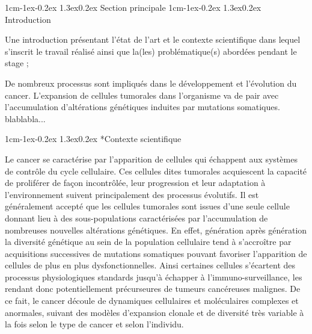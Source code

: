 \documentclass[12pt]{report}
\makeatletter
\renewcommand\section{\@startsection{section}{1}{\z@}%
	{1cm\@plus -1ex\@minus -0.2ex}%
	{1.3ex\@plus 0.2ex}%
	{\reset@font\Large\bf\sc}}
\renewcommand\subsection{\@startsection{subsection}{2}{\z@}%
	{1cm\@plus -1ex\@minus -0.2ex}%
	{1.3ex\@plus 0.2ex}%
	{\reset@font\large\bf}}
\renewcommand\subsubsection{\@startsection{subsubsection}{3}{\z@}%
	{1cm\@plus -1ex\@minus -0.2ex}%
	{1.3ex\@plus 0.2ex}%
	{\reset@font\normalsize\bf}}
\makeatother
\begin{document}
\section{Section principale}
\subsection{Introduction}

Une introduction présentant l'état de l'art et le contexte scientifique dans lequel s'inscrit le travail réalisé ainsi que la(les) problématique(s) abordées pendant le stage ;

De nombreux processus sont impliqués dans le développement et l’évolution du cancer. L’expansion de cellules tumorales dans l’organisme va de pair avec l’accumulation d’altérations génétiques induites par mutations somatiques.
blablabla...

\subsubsection*{Contexte scientifique}

Le cancer se caractérise par l'apparition de cellules qui échappent aux systèmes de contrôle du cycle cellulaire.
Ces cellules dites tumorales acquiescent la capacité de proliférer de façon incontrôlée, leur progression et leur adaptation à l'environnement suivent principalement des processus évolutifs. 
Il est généralement accepté que les cellules tumorales sont issues d’une seule cellule donnant lieu à des sous-populations caractérisées par l'accumulation de nombreuses nouvelles altérations génétiques. 
En effet, génération après génération la diversité génétique au sein de la population cellulaire tend à s'accroître par acquisitions successives de mutations somatiques\cite{MCGRANAHAN201515} pouvant favoriser l'apparition de cellules de plus en plus dysfonctionnelles. 
Ainsi certaines cellules s'écartent des processus physiologiques standards jusqu'à échapper à l'immuno-surveillance, les rendant donc potentiellement précurseures de tumeurs cancéreuses malignes. 
De ce fait, le cancer découle de dynamiques cellulaires et moléculaires complexes et anormales, suivant des modèles d’expansion clonale et de diversité très variable à la fois selon le type de cancer et selon l’individu. 
\end{document}
